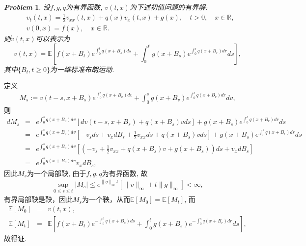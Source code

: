 \documentclass{article}
\makeatletter
\newtheorem{problem}{\itshape Problem}
\renewenvironment{proof}[1][\proofname]{\par
  \pushQED{\qed}%
  \normalfont \topsep6\p@\@plus6\p@\relax
  \trivlist
  \item[\hskip\labelsep
        \bfseries\itshape
    #1\@addpunct{.}]\ignorespaces
}{%
  \popQED\endtrivlist\@endpefalse
}
\makeatother
\begin{document}
\begin{problem}
设$f,g,q$为有界函数, $v(t,x)$为下述初值问题的有界解:
\begin{equation*}
  \begin{aligned}
    & v_t(t, x)=\frac{1}{2} v_{x x}(t, x)+q(x) v_x(t, x)+g(x),\quad t>0,\quad x \in \mathbb{R}, \\
    & v(0, x)=f(x),\quad x \in  \mathbb{R}.
    \end{aligned}
\end{equation*}
则$v(t,x)$可以表示为
\begin{equation*}
  v(t, x)=\mathbb{E}\left[f\left(x+B_t\right) e^{\int_0^t q\left(x+B_s\right) d s}+\int_0^t g\left(x+B_s\right) e^{\int_0^s q\left(x+B_r\right) d r} d s\right],
  \end{equation*}
  其中$\{B_t,t\ge 0\}$为一维标准布朗运动.
\end{problem}

  \begin{proof}
定义
\begin{eqnarray*}
  M_s := v(t-s,x+B_s)e^{\int_0^s q(x+B_v)dv} +\int_0^s g(x+B_v) e^{\int_0^s q(x+B_r)dr}dv,
\end{eqnarray*}
则 
\begin{eqnarray*}
  dM_s &=& e^{\int_0^s q(x+B_v)dv} \left[dv(t-s,x+B_s)+ q(x+B_s)vds\right]+g(x+B_s) e^{\int_0^s q(x+B_r)dr} ds\\
  &=& e^{\int_0^s q(x+B_v)dv} \left[-v_sds +v_x dB_s +\frac{1}{2}v_{xx}ds + q(x+B_s)vds\right]+g(x+B_s) e^{\int_0^s q(x+B_r)dr}ds \\
  &=& e^{\int_0^s q(x+B_v)dv} \left[ \left(-v_s+\frac{1}{2}v_{xx} + q(x+B_s)v +g(x+B_s) \right) ds +v_x dB_s\right] \\
  &=& e^{\int_0^s q(x+B_v)dv} v_x dB_s,
\end{eqnarray*}
因此$M_s$为一个局部鞅, 由于$f,g,q$为有界函数, 故
\begin{eqnarray*}
  \sup_{0\le s\le t} |M_s| \le e^{\|q\|_\infty t} \left[\|v\|_\infty + t\|g\|_\infty\right]<\infty,
\end{eqnarray*}
有界局部鞅是鞅，因此$M_s$为一个鞅，从而$\mathbb{E}\left[M_0\right]=\mathbb{E}\left[M_t\right]$, 而
\begin{eqnarray*}
  \mathbb{E}\left[M_0\right]&=& v(t,x),\\
  \mathbb{E}\left[M_t\right]&=&\mathbb{E}\left[f\left(x+B_t\right) e^{-\int_0^t q\left(x+B_s\right) d s}+\int_0^t g\left(x+B_s\right) e^{-\int_0^s q\left(x+B_r\right) d r} d s\right],
\end{eqnarray*}
故得证.
  \end{proof}
\end{document}

